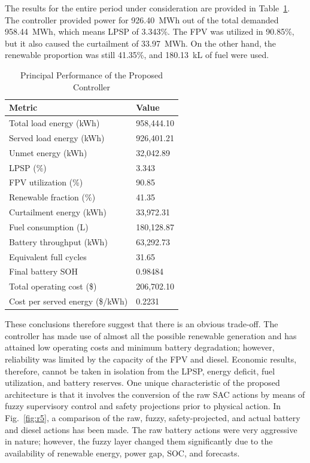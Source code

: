 \documentclass[journal]{IEEEtran}
\begin{document}
The results for the entire period under consideration are provided in
Table~\ref{tab:r2}. The controller provided power for 926.40~MWh out of the total
demanded 958.44~MWh, which means LPSP of 3.343\%. The FPV was utilized in 90.85\%,
but it also caused the curtailment of 33.97~MWh. On the other hand, the renewable
proportion was still 41.35\%, and 180.13~kL of fuel were used.

\begin{table}[!ht]
\caption{Principal Performance of the Proposed Controller}
\label{tab:r2}
\centering
\renewcommand{\arraystretch}{1.15}
\begin{tabular}{p{4.8cm} p{2.4cm}}
\toprule
\textbf{Metric} & \textbf{Value} \\
\midrule
Total load energy (kWh) & 958,444.10 \\
Served load energy (kWh) & 926,401.21 \\
Unmet energy (kWh) & 32,042.89 \\
LPSP (\%) & 3.343 \\
FPV utilization (\%) & 90.85 \\
Renewable fraction (\%) & 41.35 \\
Curtailment energy (kWh) & 33,972.31 \\
Fuel consumption (L) & 180,128.87 \\
Battery throughput (kWh) & 63,292.73 \\
Equivalent full cycles & 31.65 \\
Final battery SOH & 0.98484 \\
Total operating cost (\$) & 206,702.10 \\
Cost per served energy (\$/kWh) & 0.2231 \\
\bottomrule
\end{tabular}
\end{table}

These conclusions therefore suggest that there is an obvious trade-off. The controller has made use of almost all the possible renewable generation and has attained low operating costs and minimum battery degradation; however, reliability was limited by the capacity of the FPV and diesel. Economic results, therefore, cannot be taken in isolation from the LPSP, energy deficit, fuel utilization, and battery reserves. One unique characteristic of the proposed architecture is that it involves the conversion of the raw SAC actions by means of fuzzy supervisory control and safety projections prior to physical action. In Fig.~\ref{fig:r5}, a comparison of the raw, fuzzy, safety-projected, and actual battery and diesel actions has been made. The raw battery actions were very aggressive in nature; however, the fuzzy layer changed them significantly due to the availability of renewable energy, power gap, SOC, and forecasts.
\end{document}
